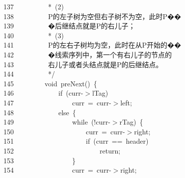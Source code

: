\documentclass[11pt,a4paper]{ctexart}
\newcommand{\hlstd}[1]{\textcolor[rgb]{0.2,0.2,0.2}{#1}}
\newcommand{\hlcom}[1]{\textcolor[rgb]{0.59,0.59,0.59}{#1}}
\newcommand{\hlopt}[1]{\textcolor[rgb]{0.2,0.2,0.2}{#1}}
\newcommand{\hllin}[1]{\textcolor[rgb]{0.59,0.59,0.59}{#1}}
\newcommand{\hlkwa}[1]{\textcolor[rgb]{0.23,0.42,0.78}{#1}}
\newcommand{\hlkwb}[1]{\textcolor[rgb]{0.63,0,0.31}{#1}}
\newcommand{\hlkwd}[1]{\textcolor[rgb]{0.78,0.23,0.41}{#1}}
\begin{document}
\hllin{137\ }\hlcom{}\hlstd{\ \ \ \ \ \ \ \ \ }\hlcom{{*}\ (2)}\Righttorque\\
\hllin{138\ }\hlcom{}\hlstd{\ \ \ \ \ \ \ \ \ }\hlcom{P的左子树为空但右子树不为空，此时P��}\Righttorque\\
\hllin{139\ }\hlcom{}\hlstd{\ \ \ \ \ \ \ \ \ }\hlcom{�后继结点就是P的右儿子；}\\
\hllin{140\ }\hlcom{}\hlstd{\ \ \ \ \ \ \ \ \ }\hlcom{{*}\ (3)}\Righttorque\\
\hllin{141\ }\hlcom{}\hlstd{\ \ \ \ \ \ \ \ \ }\hlcom{P的左右子树均为空，此时在从P开始的��}\Righttorque\\
\hllin{142\ }\hlcom{}\hlstd{\ \ \ \ \ \ \ \ \ }\hlcom{�线索序列中，第一个有右儿子的节点的}\Righttorque\\
\hllin{143\ }\hlcom{}\hlstd{\ \ \ \ \ \ \ \ \ }\hlcom{右儿子或者头结点就是P的后继结点。}\\
\hllin{144\ }\hlcom{}\hlstd{\ \ \ \ \ \ \ \ \ }\hlcom{{*}/}\hlstd{}\\
\hllin{145\ }\hlstd{}\hlstd{\ \ \ \ \ \ \ \ }\hlstd{}\hlkwb{void\ }\hlstd{}\hlkwd{preNext}\hlstd{}\hlopt{()\ \{}\\
\hllin{146\ }\hlstd{}\hlstd{\ \ \ \ \ \ \ \ \ \ \ \ }\hlstd{}\hlkwa{if\ }\hlstd{}\hlopt{(}\hlstd{curr}\hlopt{{-}$>$}\hlstd{lTag}\hlopt{)}\\
\hllin{147\ }\hlstd{}\hlstd{\ \ \ \ \ \ \ \ \ \ \ \ \ \ \ \ }\hlstd{curr\ }\hlopt{=\ }\hlstd{curr}\hlopt{{-}$>$}\hlstd{left}\hlopt{;}\\
\hllin{148\ }\hlstd{}\hlstd{\ \ \ \ \ \ \ \ \ \ \ \ }\hlstd{}\hlkwa{else\ }\hlstd{}\hlopt{\{}\\
\hllin{149\ }\hlstd{}\hlstd{\ \ \ \ \ \ \ \ \ \ \ \ \ \ \ \ }\hlstd{}\hlkwa{while\ }\hlstd{}\hlopt{(!}\hlstd{curr}\hlopt{{-}$>$}\hlstd{rTag}\hlopt{)\ \{}\\
\hllin{150\ }\hlstd{}\hlstd{\ \ \ \ \ \ \ \ \ \ \ \ \ \ \ \ \ \ \ \ }\hlstd{curr\ }\hlopt{=\ }\hlstd{curr}\hlopt{{-}$>$}\hlstd{right}\hlopt{;}\\
\hllin{151\ }\hlstd{}\hlstd{\ \ \ \ \ \ \ \ \ \ \ \ \ \ \ \ \ \ \ \ }\hlstd{}\hlkwa{if\ }\hlstd{}\hlopt{(}\hlstd{curr\ }\hlopt{==\ }\hlstd{header}\hlopt{)}\\
\hllin{152\ }\hlstd{}\hlstd{\ \ \ \ \ \ \ \ \ \ \ \ \ \ \ \ \ \ \ \ \ \ \ \ }\hlstd{}\hlkwa{return}\hlstd{}\hlopt{;}\\
\hllin{153\ }\hlstd{}\hlstd{\ \ \ \ \ \ \ \ \ \ \ \ \ \ \ \ }\hlstd{}\hlopt{\}}\\
\hllin{154\ }\hlstd{}\hlstd{\ \ \ \ \ \ \ \ \ \ \ \ \ \ \ \ }\hlstd{curr\ }\hlopt{=\ }\hlstd{curr}\hlopt{{-}$>$}\hlstd{right}\hlopt{;}\\
\end{document}
